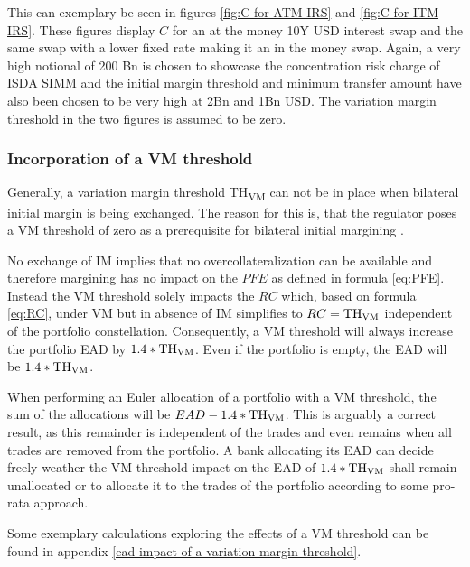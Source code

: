 \documentclass[../Thesis_AHoecherl.tex]{subfiles}
\begin{document}
    This can exemplary be seen in figures \ref{fig:C for ATM IRS} and \ref{fig:C for ITM IRS}. These figures display $C$ for an at the money 10Y USD interest swap and the same swap with a lower fixed rate making it an in the money swap. Again, a very high notional of 200 Bn is chosen to showcase the concentration risk charge of \gls{ISDA SIMM} and the initial margin threshold and minimum transfer amount have also been chosen to be very high at 2Bn and 1Bn USD. The variation margin threshold in the two figures is assumed to be zero.

    \subsubsection{Incorporation of a VM threshold\label{sec:Incorporation of a VM threshold}}
    
    Generally, a variation margin threshold TH\textsubscript{VM} can not be in place when bilateral initial margin is being exchanged. The reason for this is, that the regulator poses a \gls{VM} threshold of zero as a prerequisite for bilateral initial margining \cite[Requirement 2.1]{BCBS_MarginRequirements}.

    No exchange of \gls{IM} implies that no overcollateralization can be available and therefore margining has no impact on the $PFE$ as defined in formula \ref{eq:PFE}. Instead the \gls{VM} threshold solely impacts the $RC$ which, based on formula \ref{eq:RC}, under \gls{VM} but in absence of \gls{IM} simplifies to $RC = \text{TH\textsubscript{VM}}$ independent of the portfolio constellation. 
    Consequently, a \gls{VM} threshold will always increase the portfolio \gls{EAD} by $1.4*\text{TH\textsubscript{VM}}$. Even if the portfolio is empty, the \gls{EAD} will be $1.4 * \text{TH\textsubscript{VM}}$.

    When performing an Euler allocation of a portfolio with a \gls{VM} threshold, the sum of the allocations will be $EAD - 1.4 * \text{TH\textsubscript{VM}}$. This is arguably a correct result, as this remainder is independent of the trades and even remains when all trades are removed from the portfolio. 
    A bank allocating its \gls{EAD} can decide freely weather the \gls{VM} threshold impact on the \gls{EAD} of $1.4 * \text{TH\textsubscript{VM}}$ shall remain unallocated or to allocate it to the trades of the portfolio according to some pro-rata approach.

    Some exemplary calculations exploring the effects of a \gls{VM} threshold can be found in appendix \ref{ead-impact-of-a-variation-margin-threshold}.
    
\end{document}
